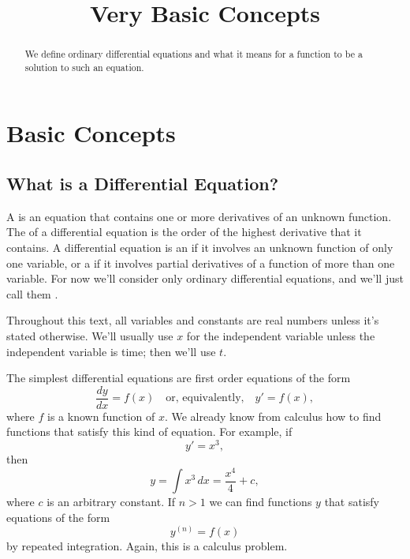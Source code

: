 \documentclass{ximera}
\title{Very Basic Concepts}
\begin{document}
 
\begin{abstract}
We define ordinary differential equations and what it means for a function to be a solution to such an equation.
\end{abstract}
 
\maketitle
 
\section*{Basic Concepts}
\subsection*{What is a Differential Equation?}
A  is an equation that contains one or more
derivatives of an unknown function. The  of a
differential equation is the order of the highest
derivative that it contains. A differential equation is an
 if it involves an unknown
function of only one variable, or a  if it involves partial derivatives of a function of more
than one variable. For now we'll consider only ordinary differential
equations, and we'll just call them .
 
Throughout this text, all variables and constants are real numbers unless it's
stated otherwise. We'll usually use $x$ for the independent variable
unless the independent variable is time; then we'll use $t$.
 
The simplest differential equations are first order equations of the
form
$$
\frac{dy}{dx}=f(x) \quad \text{or, equivalently,} \quad y'=f(x),
$$
where $f$  is a known function of $x$. We already know from calculus
how to find functions that satisfy this kind of equation. For example,
if
$$
y'=x^3,
$$
then
$$
y=\int x^3\, dx=\frac{x^4}{4}+c,
$$
 where $c$ is an arbitrary constant.  If $n>1$
we can find functions $y$ that satisfy
equations of the form
\begin{equation} \label{eq:1.2.1}
y^{(n)}=f(x)
\end{equation}
by repeated integration. Again, this is a calculus problem.
 
\end{document}
